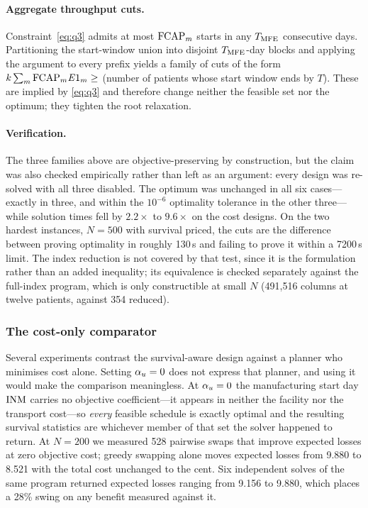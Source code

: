 \paragraph{Aggregate throughput cuts.} Constraint~\eqref{eq:q3} admits at most
$\mathrm{FCAP}_m$ starts in any $T_{\mathrm{MFE}}$ consecutive days. Partitioning the start-window
union into disjoint $T_{\mathrm{MFE}}$-day blocks and applying the argument to every
prefix yields a family of cuts of the form $k \sum_{m} \mathrm{FCAP}_m \mathit{E}1_m \ge$
(number of patients whose start window ends by $T$). These are implied by
\eqref{eq:q3} and therefore change neither the feasible set nor the optimum;
they tighten the root relaxation.

\paragraph{Verification.} The three families above are objective-preserving by
construction, but the claim was also checked empirically rather than left as an
argument: every design was re-solved with all three disabled. The optimum was
unchanged in all six cases---exactly in three, and within the $10^{-6}$
optimality tolerance in the other three---while solution times fell by
$2.2\times$ to $9.6\times$ on the cost designs. On the two hardest instances,
$N = 500$ with survival priced, the cuts are the difference between proving
optimality in roughly 130\,s and failing to prove it within a
7200\,s limit. The index reduction is not covered by that test, since
it is the formulation rather than an added inequality; its equivalence is
checked separately against the full-index program, which is only constructible
at small $N$ (491{,}516 columns at twelve patients, against 354 reduced).

\subsubsection{The cost-only comparator}
\label{sec:tiebreak}

Several experiments contrast the survival-aware design against a planner who
minimises cost alone. Setting $\alpha_{u} = 0$ does not express that planner, and
using it would make the comparison meaningless. At $\alpha_{u} = 0$ the
manufacturing start day $\mathrm{INM}$ carries no objective coefficient---it appears in
neither the facility nor the transport cost---so \emph{every} feasible schedule
is exactly optimal and the resulting survival statistics are whichever member of
that set the solver happened to return. At $N = 200$ we measured 528 pairwise
swaps that improve expected losses at zero objective cost; greedy swapping alone
moves expected losses from 9.880 to 8.521 with the total cost unchanged to the
cent. Six independent solves of the same program returned expected losses
ranging from 9.156 to 9.880, which places a 28\% swing on any benefit measured
against it.

